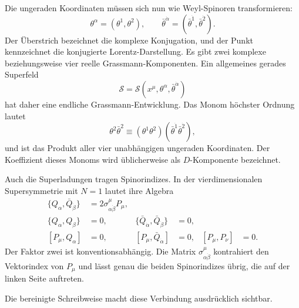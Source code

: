 Die ungeraden Koordinaten müssen sich nun wie Weyl-Spinoren transformieren:
\begin{equation}
\theta^\alpha=(\theta^1,\theta^2),
\qquad
\bar\theta^{\dot\alpha}=(\bar\theta^{\dot1},\bar\theta^{\dot2}).
\end{equation}
Der Überstrich bezeichnet die komplexe Konjugation, und der Punkt kennzeichnet die konjugierte Lorentz-Darstellung. Es gibt zwei komplexe beziehungsweise vier reelle Grassmann-Komponenten. Ein allgemeines gerades Superfeld
\begin{equation}
\mathcal S=\mathcal S(x^\mu,\theta^\alpha,\bar\theta^{\dot\alpha})
\end{equation}
hat daher eine endliche Grassmann-Entwicklung. Das Monom höchster Ordnung lautet
\begin{equation}
\theta^2\bar\theta^2
\equiv
(\theta^1\theta^2)(\bar\theta^{\dot1}\bar\theta^{\dot2}),
\end{equation}
und ist das Produkt aller vier unabhängigen ungeraden Koordinaten. Der Koeffizient dieses Monoms wird üblicherweise als \(D\)-Komponente bezeichnet.

Auch die Superladungen tragen Spinorindizes. In der vierdimensionalen Supersymmetrie mit \(N=1\) lautet ihre Algebra
\begin{align}
\{Q_\alpha,\bar Q_{\dot\beta}\}
&=2\sigma^\mu_{\alpha\dot\beta}P_\mu,
\label{eq:l8-superalgebra-main}\\
\{Q_\alpha,Q_\beta\}&=0,
&
\{\bar Q_{\dot\alpha},\bar Q_{\dot\beta}\}&=0,
\label{eq:l8-superalgebra-nilpotent}\\
[P_\mu,Q_\alpha]&=0,
&
[P_\mu,\bar Q_{\dot\alpha}]&=0,
&
[P_\mu,P_\nu]&=0.
\label{eq:l8-superalgebra-commutators}
\end{align}
Der Faktor zwei ist konventionsabhängig. Die Matrix
\(\sigma^\mu_{\alpha\dot\beta}\) kontrahiert den Vektorindex von \(P_\mu\) und lässt genau die beiden Spinorindizes übrig, die auf der linken Seite auftreten.

\begin{classroomqa}
\end{classroomqa}

Die bereinigte Schreibweise macht diese Verbindung ausdrücklich sichtbar.

